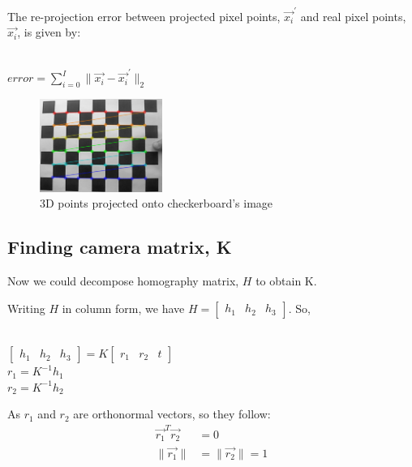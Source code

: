 \documentclass[a4paper]{article}
\begin{document}
The re-projection error between projected pixel points, $\Vec{x_{i}}^{'}$ and real pixel points, $\Vec{x_{i}}$, is given by:
\begin{center}
    \\ $error = \sum_{i=0}^{I} \| \Vec{x_{i}} - \Vec{x_{i}}^{'}\|_{2}$
\end{center}

\begin{figure}[htp]
    \centering
    \includegraphics[width=4cm]{img1.png}
    \caption{3D points projected onto checkerboard's image}
    \label{fig:galaxy}
\end{figure}

\subsection{Finding camera matrix, K}

Now we could decompose homography matrix, $H$ to obtain K.

Writing $H$ in column form, we have $H = \begin{bmatrix} h_{1} & h_{2} & h_{3} \end{bmatrix}$. So,
\begin{center}
    \\$\begin{bmatrix} h_{1} & h_{2} & h_{3}\end{bmatrix} = K \begin{bmatrix} r_{1} & r_{2} & t\end{bmatrix}$\\ 
    $r_{1} = K^{-1} h_{1}$\\
    $r_{2} = K^{-1} h_{2}$
\end{center}

As $r_1$ and $r_2$ are orthonormal vectors, so they follow:
\begin{align*}
    \Vec{r_1}^T \Vec{r_2} &= 0\\
    \|\Vec{r_1}\| &= \|\Vec{r_2}\| = 1 
\end{align*}
\end{document}
